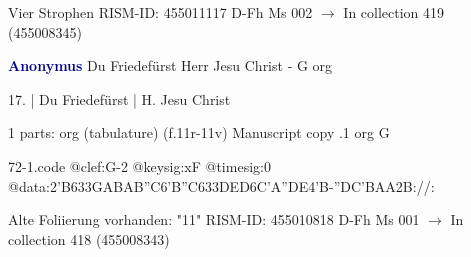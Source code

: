 \documentclass[twocolumn]{book}
\begin{document}
\newline Vier Strophen
\newline RISM-ID: 455011117
\newline D-Fh  Ms 002
\newline $\rightarrow$ In collection 419 (455008345)
      
\newline \par \vspace{7pt} \textcolor{darkblue}{\textbf{Anonymus  }}
\newline Du Friedefürst Herr Jesu Christ - G
\newline org
\newline \begin{itshape}[f.11r, at left:] 17. | Du Friedefürst | H. Jesu Christ\end{itshape} 
\newline \textcolor{darkblue}{}  1 parts: org (tabulature)  (f.11r-11v)
\newline Manuscript copy
.1  org  G  
\begin{filecontents*}{72-1.code}
@clef:G-2
@keysig:xF
@timesig:0
@data:2'B{633GAB}{AB''C}{6'B''C}{633DED}{6C'A''DE}4'B-''DC'BAA2B://:
\end{filecontents*}
\newline
%

\newline Alte Foliierung vorhanden: "11"
\newline RISM-ID: 455010818
\newline D-Fh  Ms 001
\newline $\rightarrow$ In collection 418 (455008343)
      
\end{document}
